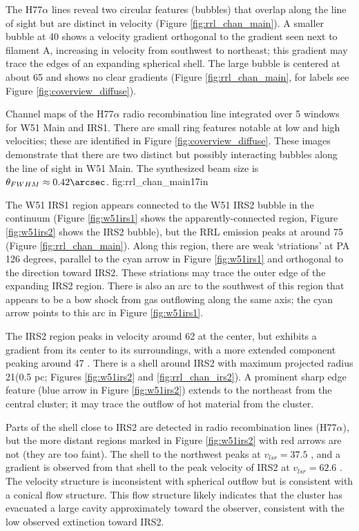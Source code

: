 The H77$\alpha$ lines reveal two circular features (bubbles) that overlap along
the line of sight but are distinct in velocity (Figure
\ref{fig:rrl_chan_main}).  A smaller bubble at 40 \kms shows a velocity
gradient orthogonal to the gradient seen next to filament A, increasing in
velocity from southwest to northeast; this gradient may trace the edges of an
expanding spherical shell.  The large bubble is centered at about 65 \kms and
shows no clear gradients (Figure \ref{fig:rrl_chan_main}, for
labels see Figure \ref{fig:coverview_diffuse}).

{Channel maps of the H77$\alpha$ radio recombination line integrated over 5 \kms windows
for W51 Main and IRS1.  There are small ring features notable at low and high
velocities; these are identified in Figure \ref{fig:coverview_diffuse}.  These
images demonstrate that there are two distinct but possibly interacting bubbles
along the line of sight in W51 Main.
The synthesized beam size is $\theta_{FWHM}\approx0.42\arcsec$.
}
{fig:rrl_chan_main}{1}{7in}

The W51 IRS1 \hii region appears connected to the W51 IRS2
bubble in the continuum (Figure \ref{fig:w51irs1} shows the
apparently-connected region, Figure \ref{fig:w51irs2} shows the IRS2 bubble),
but the RRL emission peaks at around 75 \kms (Figure \ref{fig:rrl_chan_main}).
Along this
region, there are weak `striations' at PA 126 degrees, parallel to the cyan
arrow in Figure \ref{fig:w51irs1} and orthogonal to the direction toward
IRS2.  These striations  may trace the outer edge of the expanding IRS2
region.  There is also an arc to the southwest of this region that appears to
be a bow shock from gas outflowing along the same axis; the cyan arrow points
to this arc in Figure \ref{fig:w51irs1}.

The IRS2 region peaks in velocity around 62 \kms at the center, but exhibits a
gradient from its center to its surroundings, with a more extended component
peaking around 47 \kms.  There is a shell around IRS2 with maximum projected
radius 21\arcsec (0.5 pc; Figures \ref{fig:w51irs2} and
\ref{fig:rrl_chan_irs2}).  A prominent sharp edge feature (blue arrow in Figure
\ref{fig:w51irs2}) extends to the northeast from the central cluster; it may
trace the outflow of hot material from the cluster.

Parts of the shell close to IRS2 are detected in radio recombination lines
(H77$\alpha$), but the more distant regions marked in Figure \ref{fig:w51irs2}
with red arrows are not (they are too faint).  The shell to the northwest peaks
at $v_{lsr}=37.5$ \kms, and a gradient is observed from that shell to the peak
velocity of IRS2 at $v_{lsr} = 62.6$ \kms.  The velocity structure is
inconsistent with spherical outflow but is consistent with a conical flow
structure.  This flow structure likely
indicates that the cluster has evacuated a large cavity approximately toward
the observer, consistent with the low observed extinction toward
IRS2.  

